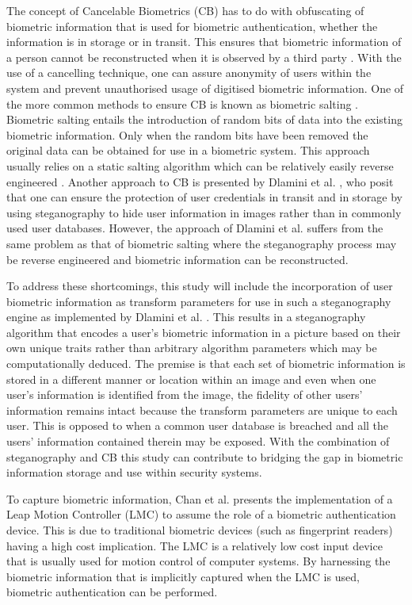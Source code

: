 The concept of Cancelable Biometrics (CB) has to do with obfuscating of biometric information that is used for biometric authentication, whether the information is in storage or in transit. This ensures that biometric information of a person cannot be reconstructed when it is observed by a third party \cite{Shahim2016}. With the use of a cancelling technique, one can assure anonymity of users within the system and prevent unauthorised usage of digitised biometric information. One of the more common methods to ensure CB is known as biometric salting \cite{Rathgeb2011}. Biometric salting entails the introduction of random bits of data into the existing biometric information. Only when the random bits have been removed the original data can be obtained for use in a biometric system. This approach usually relies on a static salting algorithm which can be relatively easily reverse engineered \cite{Shahim2016}. Another approach to CB is presented by Dlamini et al. \cite{Dlamini2016}, who posit that one can ensure the protection of user credentials in transit and in storage by using steganography to hide user information in images rather than in commonly used user databases. However, the approach of Dlamini et al. \cite{Dlamini2016} suffers from the same problem as that of biometric salting where the steganography process may be reverse engineered and biometric information can be reconstructed. 

To address these shortcomings, this study will include the incorporation of user biometric information as transform parameters for use in such a steganography engine as implemented by Dlamini et al. \cite{Dlamini2016}. This results in a steganography algorithm that encodes a user’s biometric information in a picture based on their own unique traits rather than arbitrary algorithm parameters which may be computationally deduced. The premise is that each set of biometric information is stored in a different manner or location within an image and even when one user’s information is identified from the image, the fidelity of other users’ information remains intact because the transform parameters are unique to each user. This is opposed to when a common user database is breached and all the users’ information contained therein may be exposed. With the combination of steganography and CB this study can contribute to bridging the gap in biometric information storage and use within security systems.

To capture biometric information, Chan et al. \cite{Chan2015} presents the implementation of a Leap Motion Controller (LMC) to assume the role of a biometric authentication device. This is due to traditional biometric devices (such as fingerprint readers) having a high cost implication. The LMC is a relatively low cost input device that is usually used for motion control of computer systems. By harnessing the biometric information that is implicitly captured when the LMC is used, biometric authentication can be performed. 


